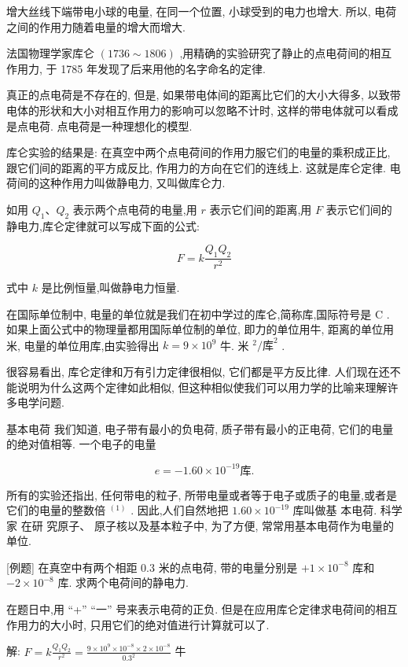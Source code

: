 \documentclass[10pt]{article}
\begin{document}
增大丝线下端带电小球的电量, 在同一个位置, 小球受到的电力也增大. 所以, 电荷之间的作用力随着电量的增大而增大.

法国物理学家库仑 \(\left( {{1736} \sim {1806}}\right)\) ,用精确的实验研究了静止的点电荷间的相互作用力, 于 1785 年发现了后来用他的名字命名的定律.

真正的点电荷是不存在的, 但是, 如果带电体间的距离比它们的大小大得多, 以致带电体的形状和大小对相互作用力的影响可以忽略不计时, 这样的带电体就可以看成是点电荷. 点电荷是一种理想化的模型.

库仑实验的结果是: 在真空中两个点电荷间的作用力服它们的电量的乘积成正比, 跟它们间的距离的平方成反比, 作用力的方向在它们的连线上. 这就是库仑定律. 电荷间的这种作用力叫做静电力, 又叫做库仑力.

如用 \({Q}_{1}\text{、}{Q}_{2}\) 表示两个点电荷的电量,用 \(r\) 表示它们间的距离,用 \(F\) 表示它们间的静电力,库仑定律就可以写成下面的公式:

\[
F = k\frac{{Q}_{1}{Q}_{2}}{{r}^{2}}
\]

式中 \(k\) 是比例恒量,叫做静电力恒量.

在国际单位制中, 电量的单位就是我们在初中学过的库仑,简称库,国际符号是 \(\mathrm{C}\) . 如果上面公式中的物理量都用国际单位制的单位, 即力的单位用牛, 距离的单位用米, 电量的单位用库,由实验得出 \(k = 9 \times {10}^{9}\) 牛. 米 \({}^{2}/{\text{库}}^{2}\) .

很容易看出, 库仑定律和万有引力定律很相似, 它们都是平方反比律. 人们现在还不能说明为什么这两个定律如此相似, 但这种相似使我们可以用力学的比喻来理解许多电学问题.

基本电荷 我们知道, 电子带有最小的负电荷, 质子带有最小的正电荷, 它们的电量的绝对值相等. 一个电子的电量

\[
e = - {1.60} \times {10}^{-{19}}\text{库.}
\]

所有的实验还指出, 任何带电的粒子, 所带电量或者等于电子或质子的电量,或者是它们的电量的整数倍 \({}^{\left( 1\right) }\) . 因此,人们自然地把 \({1.60} \times {10}^{-{19}}\) 库叫做基 本电荷. 科学家 在研 究原子、 原子核以及基本粒子中, 为了方便, 常常用基本电荷作为电量的单位.

[例题] 在真空中有两个相距 0.3 米的点电荷, 带的电量分别是 \(+ 1 \times {10}^{-8}\) 库和 \(- 2 \times {10}^{-8}\) 库. 求两个电荷间的静电力.

在题日中,用 “+” “一” 号来表示电荷的正负. 但是在应用库仑定律求电荷间的相互作用力的大小时, 只用它们的绝对值进行计算就可以了.

解: \(F = k\frac{{Q}_{1}{Q}_{2}}{{r}^{2}} = \frac{9 \times {10}^{9} \times {10}^{-8} \times 2 \times {10}^{-8}}{{0.3}^{2}}\) 牛
\end{document}
